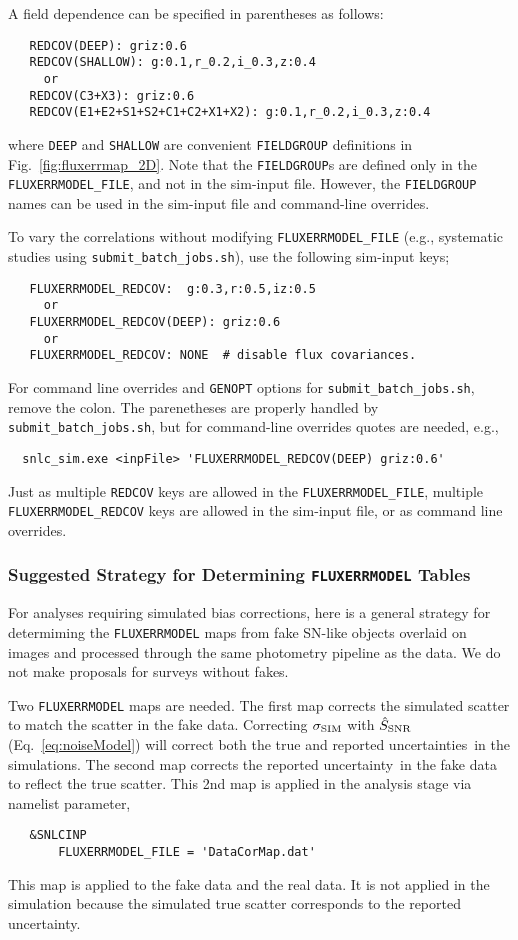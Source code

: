 \documentclass[12pt]{article}
\newcommand{\unc}{uncertainty}
\newcommand{\uncs}{uncertainties}
\newcommand{\sigSIM}{\sigma_{\rm SIM}}
\newcommand{\SSNR}{\hat{S}_{\rm SNR}}
\newcommand{\submit}{\tt submit\_batch\_jobs.sh}
\begin{document}
{A field dependence can be specified in parentheses as follows:
\begin{Verbatim}
   REDCOV(DEEP): griz:0.6
   REDCOV(SHALLOW): g:0.1,r_0.2,i_0.3,z:0.4
     or
   REDCOV(C3+X3): griz:0.6
   REDCOV(E1+E2+S1+S2+C1+C2+X1+X2): g:0.1,r_0.2,i_0.3,z:0.4
\end{Verbatim}
%
where {\tt DEEP} and {\tt SHALLOW} are convenient 
{\tt FIELDGROUP} definitions in Fig.~\ref{fig:fluxerrmap_2D}.
Note that the {\tt FIELDGROUP}s are defined only in the
{\tt FLUXERRMODEL\_FILE}, and not in the sim-input file.
However, the {\tt FIELDGROUP} names can be used in the
sim-input file and command-line overrides.

\medskip
To vary the correlations without modifying {\tt FLUXERRMODEL\_FILE}
(e.g., systematic studies using {\submit}),
use the following sim-input keys;
\begin{Verbatim}
   FLUXERRMODEL_REDCOV:  g:0.3,r:0.5,iz:0.5
     or 
   FLUXERRMODEL_REDCOV(DEEP): griz:0.6
     or 
   FLUXERRMODEL_REDCOV: NONE  # disable flux covariances.
\end{Verbatim}
For command line overrides and {\tt GENOPT} options for {\submit},
remove the colon. The parenetheses are properly handled by
{\submit}, but for command-line overrides quotes are needed,
e.g., 
\begin{Verbatim}
  snlc_sim.exe <inpFile> 'FLUXERRMODEL_REDCOV(DEEP) griz:0.6'
\end{Verbatim}
%
Just as multiple {\tt REDCOV} keys are allowed in the
{\tt FLUXERRMODEL\_FILE},
multiple {\tt FLUXERRMODEL\_REDCOV} keys are allowed
in the sim-input file, or as command line overrides.



\clearpage
\subsubsection{ Suggested Strategy for Determining {\tt FLUXERRMODEL} Tables }
\label{sss:fluxerrmap_ideas}

For analyses requiring simulated bias corrections,
here is a general strategy for determiming the {\tt FLUXERRMODEL} 
maps from fake SN-like objects overlaid on images and processed 
through the same photometry pipeline as the data. 
We do not make proposals for surveys without fakes.

Two {\tt FLUXERRMODEL} maps are needed.
The first map corrects the simulated scatter to match the
scatter in the fake data. 
Correcting $\sigSIM$ with $\SSNR$ (Eq.~\ref{eq:noiseModel}) will correct
both the true and reported \uncs\ in the simulations.
The second map corrects the reported \unc\ in the fake data
to reflect the true scatter. This 2nd map is applied in the
analysis stage via namelist parameter,
\begin{verbatim}
   &SNLCINP
       FLUXERRMODEL_FILE = 'DataCorMap.dat'
\end{verbatim}
%
This map is applied to the fake data and the real data.
It is not applied in the simulation because the simulated
true scatter corresponds to the reported \unc.

}
\end{document}
